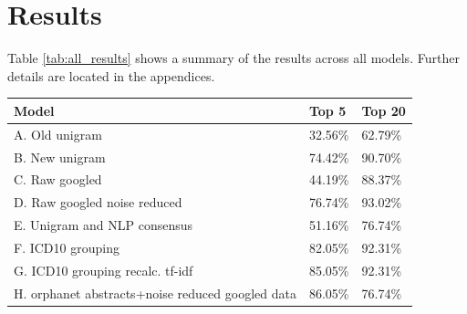 \documentclass[10pt,letterpaper,final]{article}
\begin{document}




\section{Results}
\label{chap:results}
Table \ref{tab:all_results} shows a summary of the results across all
models. Further details are located in the appendices.
\begin{center}
	\begin{tabular}{l|l|l}
		Model & Top 5 & Top 20 \\ \hline
		A. Old unigram & 32.56\% & 62.79\% \\
		B. New unigram & 74.42\% & 90.70\% \\
		C. Raw googled & 44.19\% & 88.37\% \\
		D. Raw googled noise reduced & 76.74\% & 93.02\% \\
		E. Unigram and NLP consensus & 51.16\% & 76.74\% \\
		F. ICD10 grouping & 82.05\% & 92.31\% \\
		G. ICD10 grouping recalc. tf-idf & 85.05\% & 92.31\% \\
		H. orphanet abstracts+noise reduced googled data & 86.05\% & 76.74\% \\
	\end{tabular}
	\label{tab:all_results}
\end{center}
\end{document}
